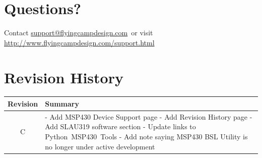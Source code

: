 \documentclass[10pt,letterpaper]{datasheet}
\makeatletter
\newcommand{\fcdsupportemail}{\href{mailto:support@flyingcampdesign.com}{support@flyingcampdesign.com}}
\newcommand{\fcdsupporturl}{\href{http://www.flyingcampdesign.com/support.html}{http://www.flyingcampdesign.com/support.html}}
\newcommand{\pmt}{Python~MSP430~Tools}
\makeatother
\begin{document}
\newpage

\section*{Questions?}
Contact \fcdsupportemail\ or visit \fcdsupporturl

\newpage

\section*{Revision History}
\label{tab:revision-history}
\begin{tabularx}{\textwidth}{|c|X|}
  \hline
  Revision &
  Summary \\
  \hline
  C & - Add MSP430 Device Support page \newline %
      - Add Revision History page \newline %
      - Add SLAU319 software section \newline %
      - Update links to \pmt \newline %
      - Add note saying MSP430 BSL Utility is no longer under active development \\
  \hline
\end{tabularx}

\newpage


\end{document}
